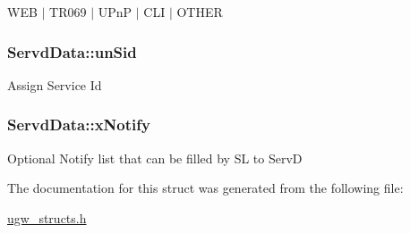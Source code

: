 W\-E\-B $\vert$ T\-R069 $\vert$ U\-Pn\-P $\vert$ C\-L\-I $\vert$ O\-T\-H\-E\-R \hypertarget{structServdData_af9ec758f5ce6532d5da3ad544c27b335}{
\subsubsection[{un\-Sid}]{ Servd\-Data\-::un\-Sid}}\label{structServdData_af9ec758f5ce6532d5da3ad544c27b335}
Assign Service Id \hypertarget{structServdData_a6532e82f2c4113c509596c7908942ccd}{
\subsubsection[{x\-Notify}]{ Servd\-Data\-::x\-Notify}}\label{structServdData_a6532e82f2c4113c509596c7908942ccd}
Optional Notify list that can be filled by S\-L to Serv\-D 

The documentation for this struct was generated from the following file\-:\begin{DoxyCompactItemize}
\item 
\hyperlink{ugw__structs_8h}{ugw\-\_\-structs.\-h}\end{DoxyCompactItemize}
